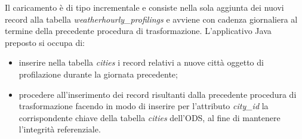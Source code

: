 Il caricamento è di tipo incrementale e consiste nella sola aggiunta dei nuovi
record alla tabella \textit{weather\-hourly\_profilings} e avviene con cadenza
giornaliera al termine della precedente procedura di trasformazione.
L'applicativo Java preposto si occupa di:
\begin{itemize}
\item inserire nella tabella \textit{cities} i record relativi a nuove città oggetto
di profilazione durante la giornata precedente;
\item procedere all'inserimento dei record risultanti dalla precedente procedura di
trasformazione facendo in modo di inserire per l'attributo \textit{city\_id}
la corrispondente chiave della tabella \textit{cities} dell'ODS, al fine
di mantenere l'integrità referenziale.
\end{itemize}
